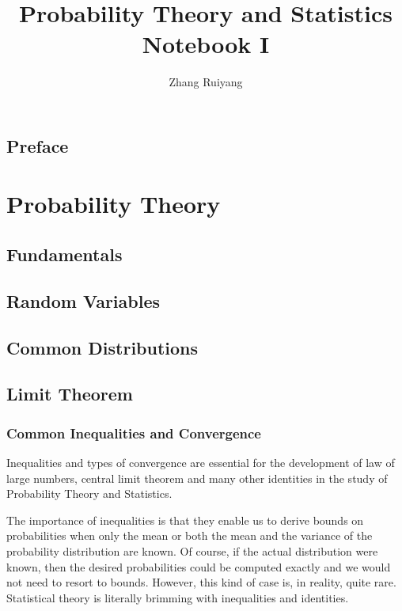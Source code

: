 \documentclass[11pt, a4paper, oneside]{book}
\theoremstyle{definition}
\begin{document}
\frontmatter 

\title{\huge Probability Theory and Statistics Notebook I}
\author{\Large{Zhang Ruiyang}}
\date{}
\maketitle

\tableofcontents

\newpage

\chapter*{Preface}

\mainmatter

\part{Probability Theory} 

\chapter{Fundamentals}
\chapter{Random Variables}
\chapter{Common Distributions}

\newpage


\chapter{Limit Theorem}

\section{Common Inequalities and Convergence}

\noindent Inequalities and types of convergence are essential for the development of law of large numbers, central limit theorem and many other identities in the study of Probability Theory and Statistics. 

\noindent The importance of inequalities is that they enable us to derive bounds on probabilities when only the mean or both the mean and the variance of the probability distribution are known. Of course, if the actual distribution were known, then the desired probabilities could be computed exactly and we would not need to resort to bounds. However, this kind of case is, in reality, quite rare. Statistical theory is literally brimming with inequalities and identities.
\end{document}
